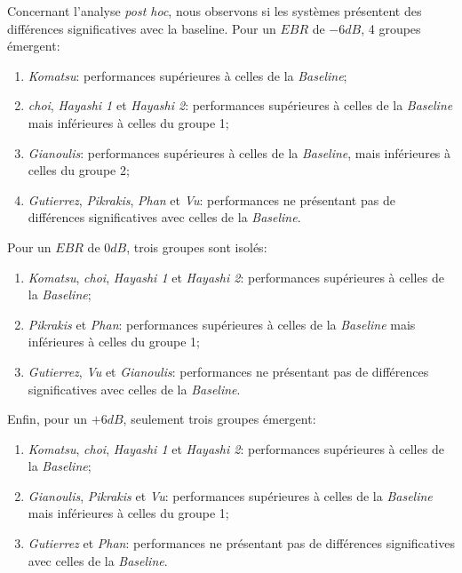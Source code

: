 Concernant l'analyse \emph{post hoc}, nous observons si les systèmes présentent des différences significatives avec la baseline. Pour un $EBR$ de $-6dB$, 4 groupes émergent:

\begin{enumerate}
\item \emph{Komatsu}: performances supérieures à celles de la \emph{Baseline};
\item \emph{choi}, \emph{Hayashi 1} et \emph{Hayashi 2}: performances supérieures à celles de la \emph{Baseline} mais inférieures à celles du groupe 1;
\item \emph{Gianoulis}: performances supérieures à celles de la \emph{Baseline}, mais inférieures à celles du groupe 2;
\item \emph{Gutierrez}, \emph{Pikrakis}, \emph{Phan} et \emph{Vu}: performances ne présentant pas de différences significatives avec celles de la \emph{Baseline}.
\end{enumerate}

Pour un $EBR$ de $0dB$, trois groupes sont isolés: 

\begin{enumerate}
\item \emph{Komatsu}, \emph{choi}, \emph{Hayashi 1} et \emph{Hayashi 2}: performances supérieures à celles de la \emph{Baseline};
\item \emph{Pikrakis} et \emph{Phan}: performances supérieures à celles de la \emph{Baseline} mais inférieures à celles du groupe 1;
\item \emph{Gutierrez}, \emph{Vu} et \emph{Gianoulis}: performances ne présentant pas de différences significatives avec celles de la \emph{Baseline}.
\end{enumerate}

Enfin, pour un $+6dB$, seulement trois groupes émergent:

\begin{enumerate}
\item \emph{Komatsu}, \emph{choi}, \emph{Hayashi 1} et \emph{Hayashi 2}: performances supérieures à celles de la \emph{Baseline};
\item \emph{Gianoulis}, \emph{Pikrakis} et \emph{Vu}: performances supérieures à celles de la \emph{Baseline} mais inférieures à celles du groupe 1;
\item \emph{Gutierrez} et \emph{Phan}: performances ne présentant pas de différences significatives avec celles de la \emph{Baseline}.
\end{enumerate}

